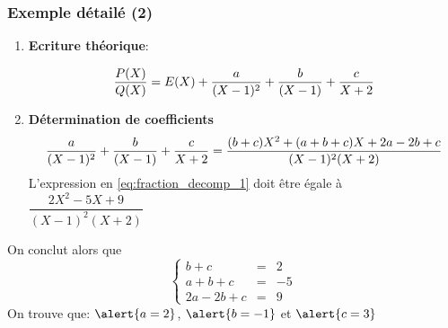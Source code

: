 \documentclass{beamer}
\begin{document}
\begin{frame}[<+->]
  \frametitle{Exemple détailé (2)}
  
   \begin{enumerate}
     \small
   \item \textbf{\alert{Ecriture théorique}}: 

     \begin{equation}
       \small
       \dfrac{P(X)}{Q(X)} = E(X) + \dfrac{a}{(X-1)^2} + \dfrac{b}{(X-1)} +
       \dfrac{c}{X+2}
     \end{equation}
     \pause

   \item \textbf{\alert{Détermination de coefficients}} 
\begin{equation}
  \small
  \label{eq:fraction_decomp_1}
  \dfrac{a}{(X-1)^2} + \dfrac{b}{(X-1)} +
  \dfrac{c}{X+2} = \dfrac{(b+c)X^2 +(a+b+c)X + 2a-2b+c}{(X-1)^2(X+2)}
\end{equation}
L'expression en \alert{\eqref{eq:fraction_decomp_1}} doit être égale à
$\dfrac{2X^2 -5X + 9}{(X-1)^2(X+2)}$
   \end{enumerate} 
   \small
   On conclut alors que
   \begin{equation}
     \left\{ \begin{array}{lcl}
         b+ c & = & 2\\ 
         a + b + c & = & -5\\
         2a -2b +c & = & 9
     \end{array}\right.
   \end{equation}
   On trouve que:  $\alert{a=2}$, $\alert{b=-1}$  et $\alert{c=3}$
\end{frame}
\end{document}
